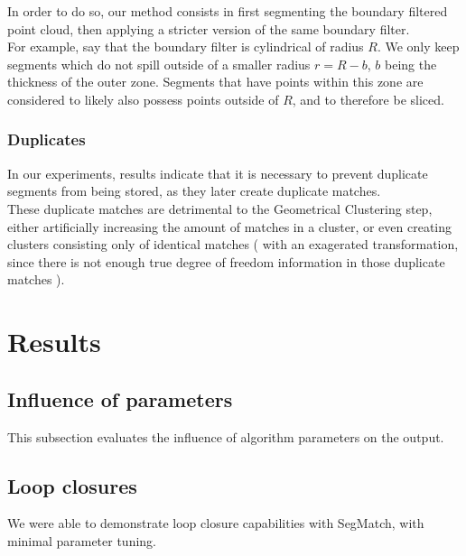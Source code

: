In order to do so, our method consists in first segmenting the boundary filtered point cloud, then applying a stricter version of the same boundary filter.\\

For example, say that the boundary filter is cylindrical of radius $R$. We only keep segments which do not spill outside of a smaller radius $r = R-b$, $b$ being the thickness of the outer zone. Segments that have points within this zone are considered to likely also possess points outside of $R$, and to therefore be sliced.\\

\subsubsection{Duplicates}
\label{subsub:sec:duplicates}

In our experiments, results indicate that it is necessary to prevent duplicate segments from being stored, as they later create duplicate matches.\\ 

These duplicate matches are detrimental to the Geometrical Clustering step, either artificially increasing the amount of matches in a cluster, or even creating clusters consisting only of identical matches ( with an exagerated transformation, since there is not enough true degree of freedom information in those duplicate matches ).


\section{Results}
\label{sec:segmatch-results}

\subsection{Influence of parameters}

This subsection evaluates the influence of algorithm parameters on the output.\\

\subsection{Loop closures}

We were able to demonstrate loop closure capabilities with SegMatch, with minimal parameter tuning.

